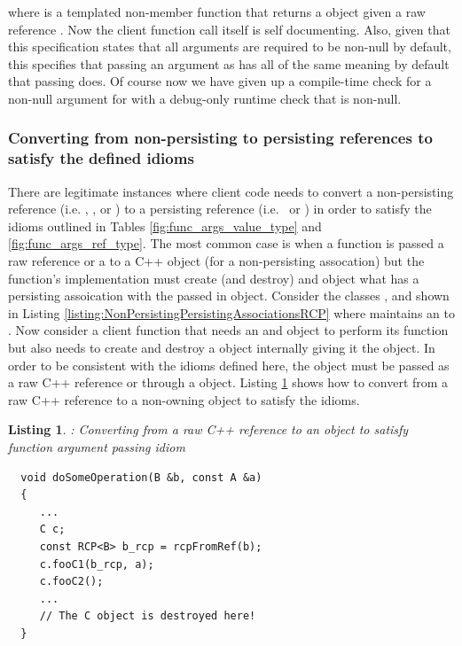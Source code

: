 \documentclass[pdf,ps2pdf,11pt]{SANDreport}
\newtheorem{listing}{Listing}
\begin{document}
where {} is a templated non-member function that
returns a {} object given a raw reference
{}.  Now the client function call itself is self
documenting.  Also, given that this specification states that all
{} arguments are required to be non-null by default,
this specifies that passing an argument as {}
has all of the same meaning by default that passing {}
does.  Of course now we have given up a compile-time check for a
non-null argument for {} with a debug-only runtime check
that {} is non-null.


%
{}\subsubsection*{Converting from non-persisting to persisting
references to satisfy the defined idioms}
%

There are legitimate instances where client code needs to convert a
non-persisting reference (i.e. {}, {}, or
{}) to a persisting reference (i.e.\ {} or
{}) in order to satisfy the idioms outlined in Tables
{}\ref{fig:func_args_value_type} and {}\ref{fig:func_args_ref_type}.
The most common case is when a function is passed a raw reference or a
{} to a C++ object (for a non-persisting assocation) but the
function's implementation must create (and destroy) and object what
has a persisting assoication with the passed in object.  Consider the
classes {}, {} and {} shown in Listing
{}\ref{listing:NonPersistingPersistingAssociationsRCP} where {}
maintains an {} to {}.  Now consider a client function
that needs an {} and {} object to perform its function
but also needs to create and destroy a {} object internally
giving it the {} object.  In order to be consistent with the
idioms defined here, the {} object must be passed as a raw C++
reference or through a {} object.  Listing
{}\ref{listing:convert-from-raw-ref-to-RCP} shows how to convert from
a raw C++ reference to a non-owning {} object to satisfy the
idioms.


{}\begin{listing}: Converting from a raw C++ reference to an
{} object to satisfy function argument passing idiom
\label{listing:convert-from-raw-ref-to-RCP}
{\small\begin{verbatim}
  void doSomeOperation(B &b, const A &a)
  {
     ...
     C c;
     const RCP<B> b_rcp = rcpFromRef(b);
     c.fooC1(b_rcp, a);
     c.fooC2();
     ...
     // The C object is destroyed here!
  }
\end{verbatim}}
\end{listing}
\end{document}
